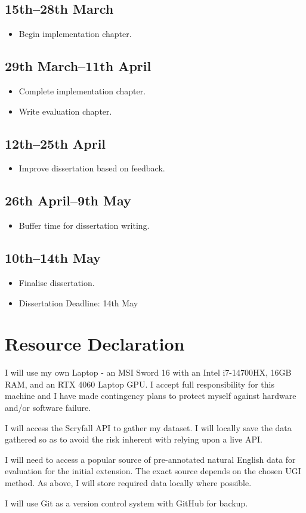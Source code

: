 \documentclass{article}
\begin{document}
\subsection{15th--28th March}
\begin{itemize}
    \item Begin implementation chapter.
\end{itemize}

\subsection{29th March--11th April}
\begin{itemize}
    \item Complete implementation chapter.
    \item Write evaluation chapter.
\end{itemize}

\subsection{12th--25th April}
\begin{itemize}
    \item Improve dissertation based on feedback.
\end{itemize}

\subsection{26th April--9th May}
\begin{itemize}
    \item Buffer time for dissertation writing.
\end{itemize}

\subsection{10th--14th May}
\begin{itemize}
    \item Finalise dissertation.
    \item Dissertation Deadline: 14th May
\end{itemize}

\section{Resource Declaration}
I will use my own Laptop - an MSI Sword 16 with an Intel i7-14700HX, 16GB RAM, and an RTX 4060 Laptop GPU. I accept full responsibility for this machine and I have made contingency plans to protect myself against hardware and/or software failure.

I will access the Scryfall API to gather my dataset. I will locally save the data gathered so as to avoid the risk inherent with relying upon a live API.

I will need to access a popular source of pre-annotated natural English data for evaluation for the initial extension. The exact source depends on the chosen UGI method. As above, I will store required data locally where possible.

I will use Git as a version control system with GitHub for backup.
\end{document}
